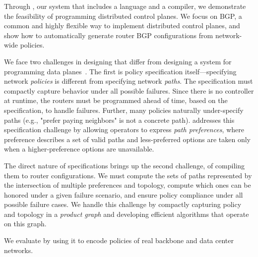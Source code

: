 Through \sysname, our system that includes a language and a compiler, we demonstrate the feasibility of programming distributed control planes. We focus on BGP, a common and highly flexible way to implement distributed control planes, and show how to automatically generate router BGP configurations from network-wide policies.

We face two challenges in designing \sysname that differ from designing a system for programming data planes~\cite{x,y,z}. The first is policy specification itself---specifying network {\em policies} is different from specifying network {\em paths}.
%
The specification must compactly capture behavior under all possible failures. Since there is no controller at runtime, the routers must be programmed ahead of time, based on the specification, to handle failures.
%
Further, many policies naturally under-specify paths (e.g., "prefer paying neighbors" is not a concrete path).
%
\sysname addresses this specification challenge by allowing operators to express {\em path preferences}, where preference describes a set of valid paths and less-preferred options are taken only when a higher-preference options are unavailable.

The direct nature of \sysname specifications brings up the second challenge, of compiling them to router configurations.  We must compute the sets of paths represented by the intersection of multiple preferences and topology, compute which ones can be honored under a given failure scenario, and ensure policy compliance under all possible failure cases. We handle this challenge by compactly capturing policy and topology in a {\em product graph} and developing efficient algorithms that operate on this graph.

We evaluate \sysname by using it to encode policies of real backbone and data center networks.



